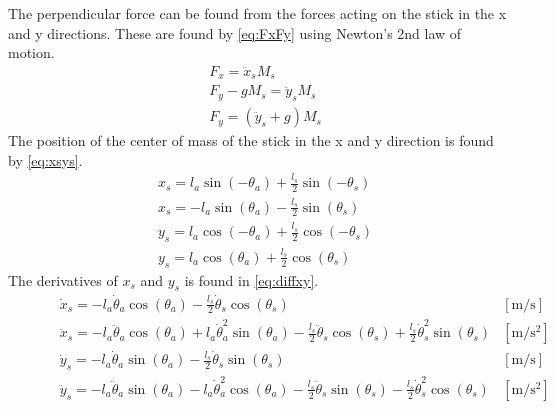 The perpendicular force can be found from the forces acting on the stick in the x and y directions. These are found by \autoref{eq:FxFy} using Newton's 2nd law of motion.
\begin{subequations}  \label{eq:FxFy}
\begin{flalign}
	& F_x=\ddot{x}_sM_s  \\
	& F_y-gM_s=\ddot{y}_sM_s  \\
	& F_y=\left(\ddot{y}_s+g\right)M_s
\end{flalign}
\end{subequations}
\startexplain
\stopexplain
The position of the center of mass of the stick in the x and y direction is found by \autoref{eq:xsys}.
\begin{subequations}\label{eq:xsys} 
\begin{flalign}
& x_s=l_a\sin (-\theta_a)+\frac{l_s}{2} \sin (-\theta_s) \\
& x_s=-l_a\sin (\theta_a)-\frac{l_s}{2} \sin (\theta_s) \\
& y_s = l_a\cos (-\theta_a)+\frac{l_s}{2} \cos(-\theta_s) \\
& y_s = l_a\cos (\theta_a)+\frac{l_s}{2} \cos(\theta_s) 
\end{flalign}
\end{subequations}
\startexplain
\stopexplain
The derivatives of $x_s$ and $y_s$ is found in \autoref{eq:diffxy}.
\begin{subequations}\label{eq:diffxy} 
\begin{flalign}
\hspace{30pt} & \dot{x}_s=-l_a\dot{\theta}_a\cos(\theta_a)-\frac{l_s}{2}\dot{\theta}_s\cos(\theta_s) & [\si{\meter\per\second}] \\
& \ddot{x}_s=-l_a\ddot{\theta}_a\cos(\theta_a)+l_a\dot{\theta}_a^2\sin(\theta_a)-\frac{l_s}{2}\ddot{\theta}_s\cos(\theta_s)+\frac{l_s}{2}\dot{\theta}_s^2\sin(\theta_s) & [\si{\meter\per\square\second}] \\
& \dot{y}_s=-l_a \dot{\theta}_a\sin(\theta_a)-\frac{l_s}{2}\dot{\theta}_s\sin(\theta_s) & [\si{\meter\per\second}] \\
& \ddot{y}_s=-l_a\ddot{\theta}_a\sin(\theta_a)-l_a\dot{\theta}_a^2\cos(\theta_a)-\frac{l_s}{2}\ddot{\theta}_s\sin(\theta_s)-\frac{l_s}{2}\dot{\theta}_s^2\cos(\theta_s) & [\si{\meter\per\square\second}]
\end{flalign}
\end{subequations}

